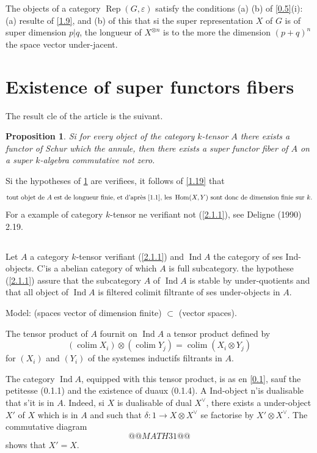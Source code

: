 \documentclass[11pt,a4paper]{article}
\theoremstyle{plain}
\newtheorem{proposition}[theorem]{Proposition}
\theoremstyle{definition}
\DeclareMathOperator{\Hom}{Hom}
\DeclareMathOperator{\Ind}{Ind}
\DeclareMathOperator*{\colim}{colim}
\newcommand{\Rep}{\operatorname{Rep}}
\begin{document}
The objects of a category $\Rep(G,\varepsilon)$ satisfy the conditions (a) (b) of \ref{0.5}(i): (a) resulte of \ref{1.9}, and (b) of this that si the super representation $X$ of $G$ is of super dimension $p|q$, the longueur of $X^{\otimes n}$ is to the more the dimension $(p+q)^n$ the space vector under-jacent.

\section{Existence of super functors fibers}\label{2}

The result cle of the article is the suivant.

\begin{proposition}\label{2.1}
Si for every object of the category $k$-tensor $A$ there exists a functor of Schur which the annule, then there exists a super functor fiber of $A$ on a super $k$-algebra commutative not zero.
\end{proposition}

Si the hypotheses of \ref{2.1} are verifiees, it follows of \ref{1.19} that
\begin{equation}\label{2.1.1}
\text{tout objet de }A\text{ est de longueur finie, et d'apr\`es \ref{1.1}, les }\Hom(X,Y)\text{ sont donc de dimension finie sur }k.
\end{equation}
For a example of category $k$-tensor ne verifiant not (\ref{2.1.1}), see Deligne (1990) 2.19.

\subsection{}\label{2.2}

Let $A$ a category $k$-tensor verifiant (\ref{2.1.1}) and $\Ind A$ the category of ses Ind-objects. C'is a abelian category of which $A$ is full subcategory. the hypothese (\ref{2.1.1}) assure that the subcategory $A$ of $\Ind A$ is stable by under-quotients and that all object of $\Ind A$ is filtered colimit filtrante of ses under-objects in $A$.

Model: (spaces vector of dimension finite) $\subset$ (vector spaces).

The tensor product of $A$ fournit on $\Ind A$ a tensor product defined by
\[
(\colim X_i)\otimes(\colim Y_j)=\colim(X_i\otimes Y_j)
\]
for $(X_i)$ and $(Y_i)$ of the systemes inductifs filtrants in $A$.

The category $\Ind A$, equipped with this tensor product, is as en \ref{0.1}, sauf the petitesse (0.1.1) and the existence of duaux (0.1.4). A Ind-object n'is dualisable that s'it is in $A$. Indeed, si $X$ is dualisable of dual $X^\vee$, there exists a under-object $X'$ of $X$ which is in $A$ and such that $\delta:1\to X\otimes X^\vee$ se factorise by $X'\otimes X^\vee$. The commutative diagram
\[
@@MATH31@@
\]
shows that $X'=X$.
\end{document}
